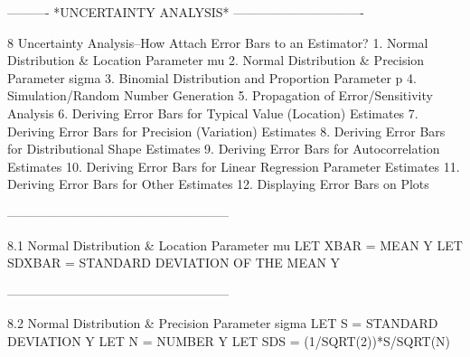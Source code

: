  
 
 
 
 
 
 
 
 
 
 
 
 
 
 
 
 
 
 
 
 
 
 
 
 
 
 
 
 
 
 
 
 
 
 
 
 
 
 
 
 
 
 
 
 
 
 
 
 
 
 
 
 
 
 
 
 
----------  *UNCERTAINTY ANALYSIS*  -------------------------------
 
8
Uncertainty Analysis--How Attach Error Bars to an Estimator?
   1. Normal Distribution & Location Parameter mu
   2. Normal Distribution & Precision Parameter sigma
   3. Binomial Distribution and Proportion Parameter p
   4. Simulation/Random Number Generation
   5. Propagation of Error/Sensitivity Analysis
   6. Deriving Error Bars for Typical Value (Location) Estimates
   7. Deriving Error Bars for Precision (Variation) Estimates
   8. Deriving Error Bars for Distributional Shape Estimates
   9. Deriving Error Bars for Autocorrelation Estimates
  10. Deriving Error Bars for Linear Regression Parameter Estimates
  11. Deriving Error Bars for Other Estimates
  12. Displaying Error Bars on Plots
 
-----------------------------------------------------
 
8.1
Normal Distribution & Location Parameter mu
      LET XBAR = MEAN Y
      LET SDXBAR = STANDARD DEVIATION OF THE MEAN Y
 
-----------------------------------------------------
 
8.2
Normal Distribution & Precision Parameter sigma
      LET S = STANDARD DEVIATION Y
      LET N = NUMBER Y
      LET SDS = (1/SQRT(2))*S/SQRT(N)
 
